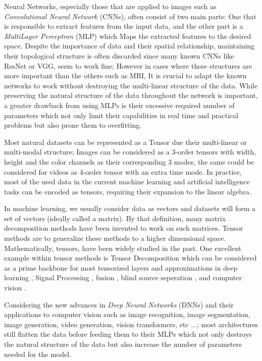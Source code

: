 \documentclass{article}
\begin{document}
 Neural Networks, especially those that are applied to images such as \textit{Convolutional Neural Network} (CNNs), often consist of two main parts: One that is responsible to extract features from the input data, and the other part is a \textit{MultiLayer Perceptron} (MLP) which Maps the extracted features to the desired space. Despite the importance of data and their spatial relationship, maintaining their topological structure is often discarded since many known CNNs like ResNet or VGG, seem to work fine; However in cases where these structures are more important than the others such as MRI, It is crucial to adapt the known networks to work without destroying the multi-linear structure of the data. While preserving the natural structure of the data throughout the network is important, a greater drawback from using MLPs is their excessive required number of parameters which not only limit their capabilities in real time and practical problems but also prone them to overfitting. 
 
 Most natural datasets can be represented as a Tensor due their multi-linear or multi-modal structure; Images can be considered as a 3-order tensors with width, height and the color channels as their corresponding 3 modes, the same could be considered for videos as 4-order tensor with an extra time mode. In practice, most of the used data in the current machine learning and artificial intelligence tasks can be encoded as tensors, requiring their expansion to the linear algebra.
 
 In machine learning, we usually consider data as vectors and datasets will form a set of vectors (ideally called a matrix). By that definition, many matrix decomposition methods have been invented to work on such matrices. Tensor methods are to generalize these methods to a higher dimensional space. 
 Mathematically, tensors, have been widely studied in the past. One excellent example within tensor methods is Tensor Decomposition which can be considered as a prime backbone for most tensorized layers and approximations in deep learning 
 \cite{r1}	
 \cite{r4},
  Signal Processing
 \cite{r2}
 \cite{r3},
 fusion
 \cite{r5}, 
 blind source seperation
 \cite{r3} 
 \cite{r6},
 and computer vision
 \cite{r7}
 .  
 
Considering the new advances in \textit{Deep Neural Networks} (DNNs) and their applications to computer vision such as image recognition, image segmentation, image generation, video generation, vision transformers, etc $\dots$; most architectures still flatten the data before feeding them to their MLPs which not only destroys the natural structure of the data but also increase the number of parameters needed for the model. 
\end{document}
